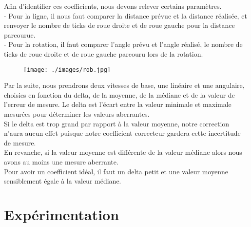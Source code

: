 \documentclass[10pt,a4paper]{article}
\begin{document}
Afin d'identifier ces coefficients, nous devons relever certains paramètres.\\
- Pour la ligne, il nous faut comparer la distance  prévue et la distance réalisée, et renvoyer le nombre de ticks de roue droite et de roue gauche pour la distance parcourue.\\
- Pour la rotation, il faut comparer l'angle prévu et l'angle réalisé, le nombre de ticks de roue droite et de roue gauche parcouru lors de la rotation.\\
\begin{figure}[h]
\centering
\texttt{[image: ./images/rob.jpg]}
\end{figure}
Par la suite, nous prendrons deux vitesses de base, une linéaire et une angulaire, choisies en fonction du delta, de la moyenne, de la médiane et de la valeur de l'erreur de mesure. Le delta est l'écart entre la valeur minimale et maximale mesurées pour déterminer les valeurs aberrantes.\\
Si le delta est trop grand par rapport à la valeur moyenne, notre correction n'aura aucun effet puisque notre coefficient correcteur gardera cette incertitude de mesure.\\
En revanche, si la valeur moyenne est différente de la valeur médiane alors nous avons au moins une mesure aberrante.\\ 
Pour avoir un coefficient idéal, il faut un delta petit et une valeur moyenne sensiblement égale à la valeur médiane.\\




\section{Expérimentation}
\end{document}
